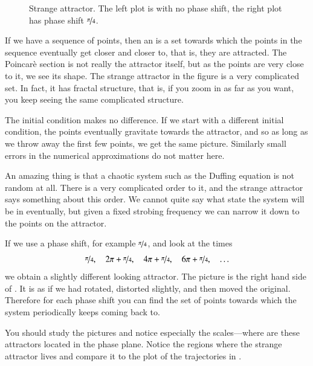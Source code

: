 \documentclass[12pt]{book}
\begin{document}
\begin{figure}[h!t]
\capstart
\begin{center}
\caption{Strange attractor.  The left plot 
is with no phase shift, the right plot has phase shift
$\nicefrac{\pi}{4}$. \label{nlin:strange}}
\end{center}
\end{figure}

If we have a sequence of points, then 
an \emph{} is a set towards which the points
in the sequence
eventually get closer and closer to, that is, they are attracted.  The
Poincar\`e section is not really the attractor itself, but as
the points are very close to it, we see its shape.  The strange
attractor in the figure is a very complicated set.   In fact, it has
fractal structure, that is, if you zoom in as far as you want, you
keep seeing the same complicated structure.

The initial condition makes no difference.  If
we start with a different initial condition, the points eventually
gravitate towards the attractor, and so as long as we throw away the first
few points, we get the same picture.
Similarly small errors in the numerical approximations do not matter here.

An amazing thing is that a chaotic system such as the Duffing equation is
not random at all.  There is a very complicated order to it, and the strange
attractor says something about this order.  We cannot quite say what state
the system will be in eventually, but given a fixed strobing frequency we
can narrow it down to the points on the attractor.

If we use a phase shift, for example $\nicefrac{\pi}{4}$, and look at the
times
\begin{equation*}
\nicefrac{\pi}{4}, \quad
2\pi+\nicefrac{\pi}{4}, \quad
4\pi+\nicefrac{\pi}{4}, \quad
6\pi+\nicefrac{\pi}{4}, \quad
\ldots
\end{equation*}
we obtain a slightly different looking attractor.
The picture is the right hand side of 
.
It is as if we had
rotated, distorted slightly, and then moved the original.
Therefore for each phase shift you can find the
set of points towards which the system periodically keeps coming back to.

You should study the pictures and notice especially the scales---where are
these attractors located in the phase plane.  Notice the
regions where the strange attractor lives and compare it to the plot of the
trajectories in .
\end{document}
